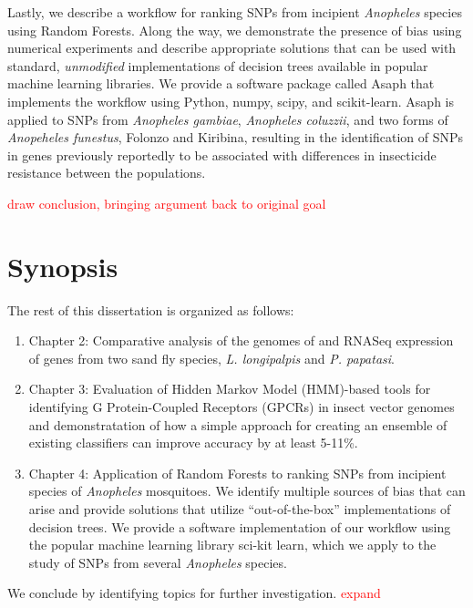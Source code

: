 Lastly, we describe a workflow for ranking SNPs from incipient \emph{Anopheles} species using Random Forests.  Along the way, we demonstrate the presence of bias using numerical experiments and describe appropriate solutions that can be used with standard, \emph{unmodified} implementations of decision trees available in popular machine learning libraries. We provide a software package called Asaph that implements the workflow using Python, numpy, scipy, and scikit-learn.  Asaph is applied to SNPs from \emph{Anopheles gambiae}, \emph{Anopheles coluzzii}, and two forms of \emph{Anopeheles funestus}, Folonzo and Kiribina, resulting in the identification of SNPs in genes previously reportedly to be associated with differences in insecticide resistance between the populations.

\textcolor{red}{draw conclusion, bringing argument back to original goal}

\section{Synopsis}
The rest of this dissertation is organized as follows:

\begin{enumerate}
\item Chapter 2: Comparative analysis of the genomes of and RNASeq expression of genes from two sand fly species, \emph{L. longipalpis} and \emph{P. papatasi}.
\item Chapter 3: Evaluation of Hidden Markov Model (HMM)-based tools for identifying G Protein-Coupled Receptors (GPCRs) in insect vector genomes and demonstratation of how a simple approach for creating an ensemble of existing classifiers can improve accuracy by at least 5-11\%.
\item Chapter 4: Application of Random Forests to ranking SNPs from incipient species of \emph{Anopheles} mosquitoes.  We identify multiple sources of bias that can arise and provide solutions that utilize ``out-of-the-box'' implementations of decision trees.  We provide a software implementation of our workflow using the popular machine learning library sci-kit learn, which we apply to the study of SNPs from several \emph{Anopheles} species.
\end{enumerate}

We conclude by identifying topics for further investigation. \textcolor{red}{expand}

